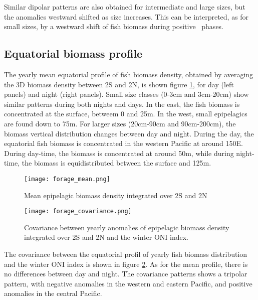 Similar dipolar patterns are also obtained for intermediate and large sizes, but the anomalies westward shifted as size increases. This can be interpreted, as for small sizes, by a westward shift of fish biomass during positive \nino\ phases.\\

\subsection{Equatorial biomass profile}

The yearly mean equatorial profile of fish biomass density, obtained by averaging the 3D biomass density between 2\degree S and 2\degree N, 
is shown figure \ref{fig:mean-forage}, for day (left panels) and night (right panels). Small size classes (0-3cm and 3cm-20cm) show similar 
patterns during both nights and days. In the east, the fish biomass is concentrated at the surface, betweem 0 and 25m. In the west, small epipelagics
are found down to 75m. For larger sizes (20cm-90cm and 90cm-200cm), the biomass vertical distribution changes between day and night. During the day, the equatorial fish biomass is concentrated in the western Pacific at around 150\degree E. During day-time, the biomass is concentrated at around 50m, while during night-time, the biomass is equidistributed between the surface and 125m.\\

\begin{figure}[h!]
    \centering	
    \texttt{[image: forage\_mean.png]}
	\caption{Mean epipelagic biomass density integrated over 2\degree S and 2\degree N}
    \label{fig:mean-forage}
\end{figure}

\begin{figure}[h!]
    \centering
    \texttt{[image: forage\_covariance.png]}
	\caption{Covariance between yearly anomalies of epipelagic biomass density integrated over 2\degree S and 2\degree N and the winter ONI index.}
    \label{fig:covariance-forage}
\end{figure}

The covariance between the equatorial profil of yearly fish biomass distribution and the winter ONI index is shown in figure \ref{fig:covariance-forage}. As for the mean profile, there is no differences between day and night. The covariance patterns shows a tripolar pattern, with negative anomalies in the western and eastern Pacific, and positive anomalies in the central Pacific.\\

